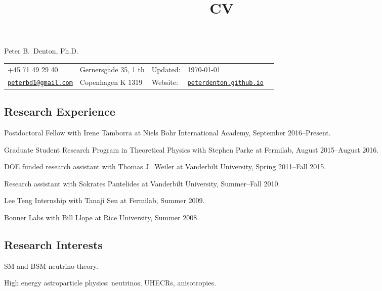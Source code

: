 \documentclass[letterpaper]{article}
\title{CV}
\newif\ifhtlatex
\def\name{Peter B.~Denton, Ph.D.}
\renewenvironment{itemize}{
\begin{list}{}{
\setlength{\leftmargin}{.5em}}}{
\end{list}}
\begin{document}
\ifhtlatex
\Tag{TITLE+}{CV}
\fi

{\huge \name}\\
\vspace*{0.1in}
\begin{tabular}{ll|l|ll}
+45 71 49 29 40 & Gernersgade 35, 1 th & Updated: & \today\\
\href{mailto:peterbd1@gmail.com}{\tt peterbd1@gmail.com} & Copenhagen K 1319 & Website: & 
\href{http://peterdenton.github.io}{\tt peterdenton.github.io}
\end{tabular}

\subsection*{Research Experience}
\begin{itemize}
\item Postdoctoral Fellow with Irene Tamborra at Niels Bohr International Academy, September 2016--Present.
\item Graduate Student Research Program in Theoretical Physics with Stephen Parke at Fermilab, August 2015--August 2016.
\item DOE funded research assistant with Thomas J.~Weiler at Vanderbilt University, Spring 2011--Fall 2015.
\item Research assistant with Sokrates Pantelides at Vanderbilt University, Summer--Fall 2010.
\item Lee Teng Internship with Tanaji Sen at Fermilab, Summer 2009.
\item Bonner Labs with Bill Llope at Rice University, Summer 2008.
\end{itemize}

\subsection*{Research Interests}
\begin{itemize}
\item SM and BSM neutrino theory.
\item High energy astroparticle physics: neutrinos, UHECRs, anisotropies.
\end{itemize}
\end{document}
